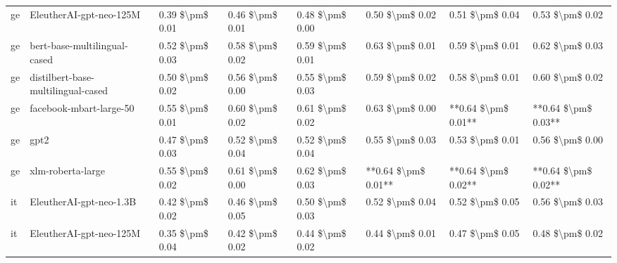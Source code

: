 \begin{tabular}{llllllll}
      ge &            EleutherAI-gpt-neo-125M & 0.39 \$\textbackslash pm\$ 0.01 &           0.46 \$\textbackslash pm\$ 0.01 &       0.48 \$\textbackslash pm\$ 0.00 &        0.50 \$\textbackslash pm\$ 0.02 &                         0.51 \$\textbackslash pm\$ 0.04 &     0.53 \$\textbackslash pm\$ 0.02 \\
      ge &       bert-base-multilingual-cased & 0.52 \$\textbackslash pm\$ 0.03 &           0.58 \$\textbackslash pm\$ 0.02 &       0.59 \$\textbackslash pm\$ 0.01 &        0.63 \$\textbackslash pm\$ 0.01 &                         0.59 \$\textbackslash pm\$ 0.01 &     0.62 \$\textbackslash pm\$ 0.03 \\
      ge & distilbert-base-multilingual-cased & 0.50 \$\textbackslash pm\$ 0.02 &           0.56 \$\textbackslash pm\$ 0.00 &       0.55 \$\textbackslash pm\$ 0.03 &        0.59 \$\textbackslash pm\$ 0.02 &                         0.58 \$\textbackslash pm\$ 0.01 &     0.60 \$\textbackslash pm\$ 0.02 \\
      ge &            facebook-mbart-large-50 & 0.55 \$\textbackslash pm\$ 0.01 &           0.60 \$\textbackslash pm\$ 0.02 &       0.61 \$\textbackslash pm\$ 0.02 &        0.63 \$\textbackslash pm\$ 0.00 &                     **0.64 \$\textbackslash pm\$ 0.01** & **0.64 \$\textbackslash pm\$ 0.03** \\
      ge &                               gpt2 & 0.47 \$\textbackslash pm\$ 0.03 &           0.52 \$\textbackslash pm\$ 0.04 &       0.52 \$\textbackslash pm\$ 0.04 &        0.55 \$\textbackslash pm\$ 0.03 &                         0.53 \$\textbackslash pm\$ 0.01 &     0.56 \$\textbackslash pm\$ 0.00 \\
      ge &                  xlm-roberta-large & 0.55 \$\textbackslash pm\$ 0.02 &           0.61 \$\textbackslash pm\$ 0.00 &       0.62 \$\textbackslash pm\$ 0.03 &    **0.64 \$\textbackslash pm\$ 0.01** &                     **0.64 \$\textbackslash pm\$ 0.02** & **0.64 \$\textbackslash pm\$ 0.02** \\
      it &            EleutherAI-gpt-neo-1.3B & 0.42 \$\textbackslash pm\$ 0.02 &           0.46 \$\textbackslash pm\$ 0.05 &       0.50 \$\textbackslash pm\$ 0.03 &        0.52 \$\textbackslash pm\$ 0.04 &                         0.52 \$\textbackslash pm\$ 0.05 &     0.56 \$\textbackslash pm\$ 0.03 \\
      it &            EleutherAI-gpt-neo-125M & 0.35 \$\textbackslash pm\$ 0.04 &           0.42 \$\textbackslash pm\$ 0.02 &       0.44 \$\textbackslash pm\$ 0.02 &        0.44 \$\textbackslash pm\$ 0.01 &                         0.47 \$\textbackslash pm\$ 0.05 &     0.48 \$\textbackslash pm\$ 0.02 \\

\end{tabular}
